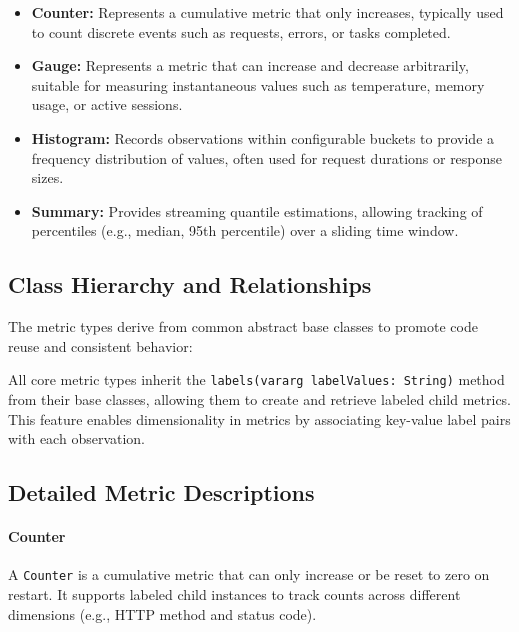 \begin{itemize}
    \item \textbf{Counter:} Represents a cumulative metric that only increases, typically used to count discrete events such as requests, errors, or tasks completed.

    \item \textbf{Gauge:} Represents a metric that can increase and decrease arbitrarily, suitable for measuring instantaneous values such as temperature, memory usage, or active sessions.

    \item \textbf{Histogram:} Records observations within configurable buckets to provide a frequency distribution of values, often used for request durations or response sizes.

    \item \textbf{Summary:} Provides streaming quantile estimations, allowing tracking of percentiles (e.g., median, 95th percentile) over a sliding time window.
\end{itemize}

\subsection{Class Hierarchy and Relationships}\label{subsec:class-hierarchy-and-relationships}

The metric types derive from common abstract base classes to promote code reuse and consistent behavior:

All core metric types inherit the \texttt{labels(vararg labelValues: String)} method from their base classes, allowing them to create and retrieve labeled child metrics.
This feature enables dimensionality in metrics by associating key-value label pairs with each observation.

\subsection{Detailed Metric Descriptions}\label{subsec:detailed-metric-descriptions}

\paragraph{Counter}

A \texttt{Counter} is a cumulative metric that can only increase or be reset to zero on restart.
It supports labeled child instances to track counts across different dimensions (e.g., HTTP method and status code).

